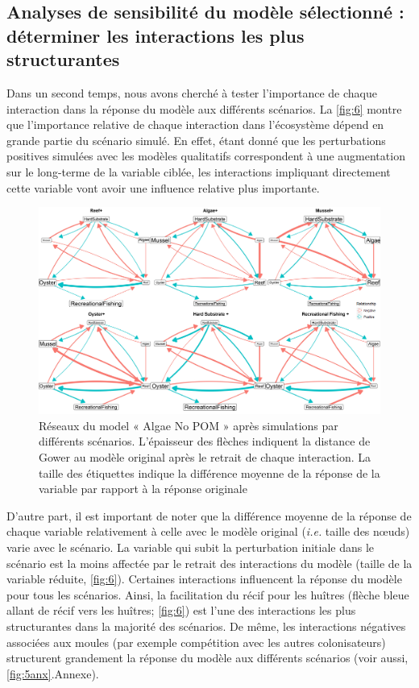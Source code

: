 \documentclass[12pt]{report}
\begin{document}
        \subsection{Analyses de sensibilité du modèle sélectionné : déterminer les interactions les plus structurantes}

Dans un second temps, nous avons cherché à tester l’importance de chaque interaction dans la réponse du modèle aux différents scénarios. La \autoref{fig:6} montre que l’importance relative de chaque interaction dans l’écosystème dépend en grande partie du scénario simulé. En effet, étant donné que les perturbations positives simulées avec les modèles qualitatifs correspondent à une augmentation sur le long-terme de la variable ciblée, les interactions impliquant directement cette variable vont avoir une influence relative plus importante. 
\begin{figure}[h]
    \centering
    \includegraphics[width = \linewidth]{networkLabelsNoBackground.jpg}
    \caption[Réponse du modèle sélectionné aux différents scénarios]{Réseaux du model « Algae No POM » après simulations par différents scénarios. L’épaisseur des flèches indiquent la distance de Gower au modèle original après le retrait de chaque interaction. La taille des étiquettes indique la différence moyenne de la réponse de la variable par rapport à la réponse originale}
    \label{fig:6}
\end{figure}
D’autre part, il est important de noter que la différence moyenne de la réponse de chaque variable relativement à celle avec le modèle original (\textit{i.e.} taille des nœuds) varie avec le scénario. La variable qui subit la perturbation initiale dans le scénario est la moins affectée par le retrait des interactions du modèle (taille de la variable réduite, \autoref{fig:6}). Certaines interactions influencent la réponse du modèle pour tous les scénarios. Ainsi, la facilitation du récif pour les huîtres (flèche bleue allant de récif vers les huîtres; \autoref{fig:6}) est l’une des interactions les plus structurantes dans la majorité des scénarios. De même, les interactions négatives associées aux moules (par exemple compétition avec les autres colonisateurs) structurent grandement la réponse du modèle aux différents scénarios (voir aussi, \autoref{fig:5anx}.Annexe). 
\end{document}
